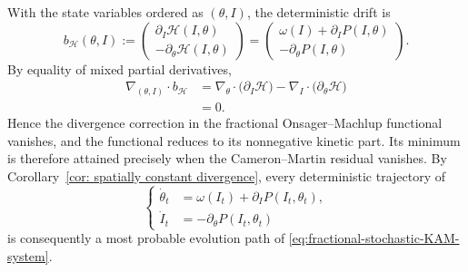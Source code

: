 \documentclass[preprint,12pt]{elsarticle}
\theoremstyle{definition}
\theoremstyle{plain}
\begin{document}
With the state variables ordered as $(\theta,I)$, the deterministic
drift is
\begin{equation}
\label{eq:KAM-Hamiltonian-vector-field}
    b_{\mathscr H}(\theta,I)
    :=
    \begin{pmatrix}
        \partial_I\mathscr H(I,\theta)
        \\
        -\partial_\theta\mathscr H(I,\theta)
    \end{pmatrix}
    =
    \begin{pmatrix}
        \omega(I)+\partial_I P(I,\theta)
        \\
        -\partial_\theta P(I,\theta)
    \end{pmatrix}.
\end{equation}
By equality of mixed partial derivatives,
\begin{equation}
\label{eq:KAM-divergence-free}
\begin{aligned}
    \nabla_{(\theta,I)}\!\cdot b_{\mathscr H}
    &=
    \nabla_\theta\!\cdot
    \bigl(\partial_I\mathscr H\bigr)
    -
    \nabla_I\!\cdot
    \bigl(\partial_\theta\mathscr H\bigr)
    \\
    &=0.
\end{aligned}
\end{equation}
Hence the divergence correction in the fractional
Onsager--Machlup functional vanishes, and the functional reduces to
its nonnegative kinetic part. Its minimum is therefore attained
precisely when the Cameron--Martin residual vanishes. By
Corollary~\ref{cor: spatially constant divergence}, every
deterministic trajectory of
\begin{equation}
\label{eq:deterministic-nearly-integrable-KAM-system}
\left\{
\begin{aligned}
    \dot\theta_t
    &=
    \omega(I_t)+\partial_I P(I_t,\theta_t),
    \\
    \dot I_t
    &=
    -\partial_\theta P(I_t,\theta_t)
\end{aligned}
\right.
\end{equation}
is consequently a most probable evolution path of
\eqref{eq:fractional-stochastic-KAM-system}.
\end{document}
